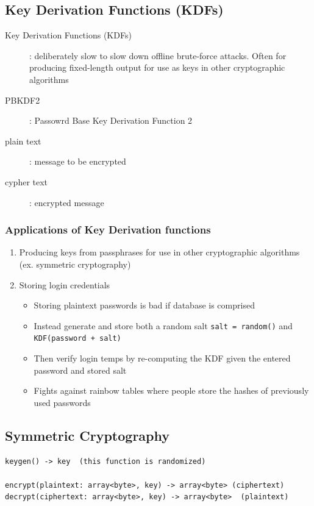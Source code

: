 \documentclass[letterpaper,12pt]{article}
\begin{document}
\subsection{Key Derivation Functions (KDFs)}
\begin{description}
 \item[Key Derivation Functions (KDFs)]: deliberately slow to slow down offline brute-force attacks. Often for producing fixed-length output for use as keys in other cryptographic algorithms
 \item[PBKDF2]: Passowrd Base Key Derivation Function 2
 \item[plain text]: message to be encrypted
 \item[cypher text]: encrypted message
\end{description}

\subsubsection{Applications of Key Derivation functions}
\begin{enumerate}
 \item Producing keys from passphrases for use in other cryptographic algorithms (ex. symmetric cryptography)
 \item Storing login credentials
       \begin{itemize}
        \item Storing plaintext passwords is bad if database is comprised
        \item Instead generate and store both a random salt \lstinline{salt = random()} and  \lstinline{KDF(password + salt)}
        \item Then verify login temps by re-computing the KDF given the entered password and stored salt
        \item Fights against rainbow tables where people store the hashes of previously used passwords
       \end{itemize}
\end{enumerate}

\subsection{Symmetric Cryptography}
\begin{lstlisting}
keygen() -> key  (this function is randomized)

encrypt(plaintext: array<byte>, key) -> array<byte> (ciphertext)
decrypt(ciphertext: array<byte>, key) -> array<byte>  (plaintext)
\end{lstlisting}
\end{document}
